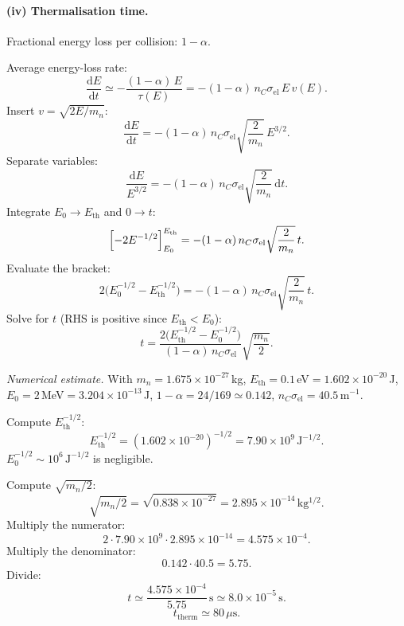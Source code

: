 \documentclass[11pt]{article}
\newcommand{\de}{\mathrm{d}}
\begin{document}
\paragraph{(iv) Thermalisation time.} Fractional energy loss per collision: $1-\alpha$.

Average energy-loss rate:
\[
\frac{\de E}{\de t}\simeq -\frac{(1-\alpha)\,E}{\tau(E)}=-(1-\alpha)\,n_C\sigma_\mathrm{el}\,E\,v(E).
\]
Insert $v=\sqrt{2E/m_n}$:
\[
\frac{\de E}{\de t}=-(1-\alpha)\,n_C\sigma_\mathrm{el}\sqrt{\frac{2}{m_n}}\,E^{3/2}.
\]
Separate variables:
\[
\frac{\de E}{E^{3/2}}=-(1-\alpha)\,n_C\sigma_\mathrm{el}\sqrt{\frac{2}{m_n}}\,\de t.
\]
Integrate $E_0\to E_\mathrm{th}$ and $0\to t$:
\[
\Bigl[-2 E^{-1/2}\Bigr]_{E_0}^{E_\mathrm{th}}=-(1-\alpha)\,n_C\sigma_\mathrm{el}\sqrt{\frac{2}{m_n}}\,t.
\]
Evaluate the bracket:
\[
2\bigl(E_0^{-1/2}-E_\mathrm{th}^{-1/2}\bigr)=-(1-\alpha)\,n_C\sigma_\mathrm{el}\sqrt{\frac{2}{m_n}}\,t.
\]
Solve for $t$ (RHS is positive since $E_\mathrm{th}<E_0$):
\[
\boxed{\;t=\frac{2\bigl(E_\mathrm{th}^{-1/2}-E_0^{-1/2}\bigr)}{(1-\alpha)\,n_C\sigma_\mathrm{el}}\sqrt{\frac{m_n}{2}}.\;}
\]

\textit{Numerical estimate.} With $m_n=1.675\times 10^{-27}$\,kg, $E_\mathrm{th}=0.1$\,eV$=1.602\times 10^{-20}$\,J, $E_0=2$\,MeV$=3.204\times 10^{-13}$\,J, $1-\alpha=24/169\simeq 0.142$, $n_C\sigma_\mathrm{el}=40.5$\,m$^{-1}$.

Compute $E_\mathrm{th}^{-1/2}$:
\[
E_\mathrm{th}^{-1/2}=(1.602\times 10^{-20})^{-1/2}=7.90\times 10^{9}\,\mathrm{J^{-1/2}}.
\]
$E_0^{-1/2}\sim 10^6\,\mathrm{J^{-1/2}}$ is negligible.

Compute $\sqrt{m_n/2}$:
\[
\sqrt{m_n/2}=\sqrt{0.838\times 10^{-27}}=2.895\times 10^{-14}\,\mathrm{kg^{1/2}}.
\]
Multiply the numerator:
\[
2\cdot 7.90\times 10^{9}\cdot 2.895\times 10^{-14}=4.575\times 10^{-4}.
\]
Multiply the denominator:
\[
0.142\cdot 40.5=5.75.
\]
Divide:
\[
t\simeq \frac{4.575\times 10^{-4}}{5.75}\,\mathrm{s}\simeq 8.0\times 10^{-5}\,\mathrm{s}.
\]
\[
\boxed{\;t_\mathrm{therm}\simeq 80\,\mu\mathrm{s}.\;}
\]
\end{document}
